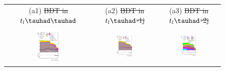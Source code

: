 \documentclass[PAPER, coverpage, atlasdraft=true, texlive=2016, UKenglish]{\ATLASLATEXPATH atlasdoc}
\providecommand{\DIFdel}[1]{{\protect\color{red}\sout{#1}}}                      %
\providecommand{\DIFdelFL}[1]{\DIFdel{#1}} %
\providecommand{\DIFaddbeginFL}{} %
\providecommand{\DIFaddendFL}{} %
\providecommand{\DIFdelbeginFL}{} %
\providecommand{\DIFdelendFL}{} %
\begin{document}
\begin{figure}[H]
\begin{tabular}{@{}ccc@{}}
(a1)  \DIFdelbeginFL \DIFdelFL{BDT in $t_l\thadhad$ }\DIFdelendFL & (a2) \DIFdelbeginFL \DIFdelFL{BDT in  $t_l\tauhad$-1j}\DIFdelendFL & (a3) \DIFdelbeginFL \DIFdelFL{BDT in $t_l\tauhad$-2j}\DIFdelendFL \\
\DIFdelbeginFL %
\DIFdelendFL \DIFaddbeginFL \includegraphics[width=0.3\textwidth]{figures/tuH_reg1l1tau1b2j_os.pdf}\DIFaddendFL &
\DIFdelbeginFL %
\DIFdelendFL \DIFaddbeginFL \includegraphics[width=0.3\textwidth]{figures/tuH_reg1l1tau1b3j_os.pdf}\DIFaddendFL &
\DIFdelbeginFL %
\DIFdelendFL \DIFaddbeginFL \includegraphics[width=0.3\textwidth]{figures/tuH_reg2mtau1b2jos.pdf}\DIFaddendFL \\

\end{tabular}
\end{figure}
\end{document}
